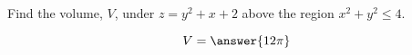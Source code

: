 \documentclass{ximera}
\author{David Guichard \and Neal Koblitz \and H. Jerome Keisler \and Albert Scheller \and Barry Balof \and Mike Wills \and Matthew Carr}
\begin{document}
\begin{exercise}





Find the volume, $V$, under $z=y^2+x+2$ above the region $x^2+y^2\le 4$.
\begin{prompt}
\[
V=\answer{12\pi}
\]
\end{prompt}



\end{exercise}
\end{document}
